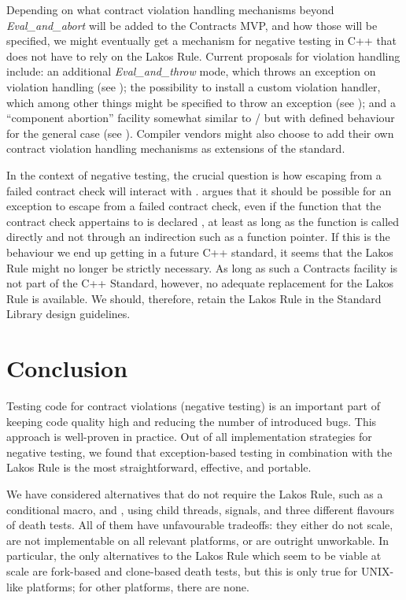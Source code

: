 Depending on what contract violation handling mechanisms beyond \mbox{\emph{Eval_and_abort}} will be added to the Contracts MVP, and how those will be specified, we might eventually get a mechanism for negative testing in C++ that does not have to rely on the Lakos Rule. Current proposals for violation handling include: an additional \emph{Eval_and_throw} mode, which throws an exception on violation handling (see \cite{P2698R0}); the possibility to install a custom violation handler, which among other things might be specified to throw an exception (see \cite{P2811R1}); and a ``component abortion'' facility somewhat similar to / but with defined behaviour for the general case (see \cite{P2784R0}). Compiler vendors might also choose to add their own contract violation handling mechanisms as extensions of the standard.

In the context of negative testing, the crucial question is how escaping from a failed contract check will interact with . \cite{P2780R0} argues that it should be possible for an exception to escape from a failed contract check, even if the function that the contract check appertains to is declared , at least as long as the function is called directly and not through an indirection such as a function pointer. If this is the behaviour we end up getting in a future C++ standard, it seems that the Lakos Rule might no longer be strictly necessary. As long as such a Contracts facility is not part of the C++ Standard, however, no adequate replacement for the Lakos Rule is available. We should, therefore, retain the Lakos Rule in the Standard Library design guidelines.

\section{Conclusion}

Testing code for contract violations (negative testing) is an important part of keeping code quality high and reducing the number of introduced bugs. This approach is well-proven in practice. Out of all implementation strategies for negative testing, we found that exception-based testing in combination with the Lakos Rule is the most straightforward, effective, and portable.

We have considered alternatives that do not require the Lakos Rule, such as a conditional  macro,  and , using child threads, signals, and three different flavours of death tests. All of them have unfavourable tradeoffs: they either do not scale, are not implementable on all relevant platforms, or are outright unworkable. In particular, the only alternatives to the Lakos Rule which seem to be viable at scale are fork-based and clone-based death tests, but this is only true for UNIX-like platforms; for other platforms, there are none.

